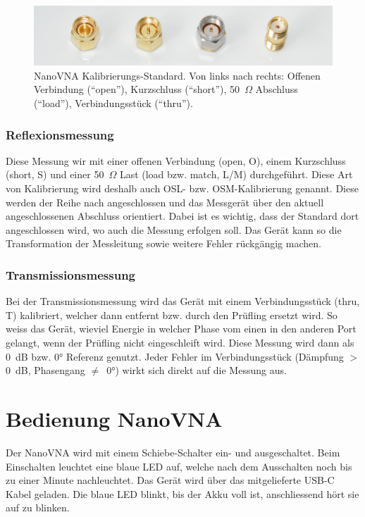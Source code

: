 \documentclass[twoside,a4paper,11pt,halfparskip,DIV=11,notitlepage]{scrartcl}
\newcommand{\Ohm}{$\Omega$\xspace}
\begin{document}
\begin{figure}[t]
    \includegraphics[width=\textwidth]{figures/calkit.jpg}
    \caption{NanoVNA Kalibrierungs-Standard. Von links nach rechts:
        Offenen Verbindung (``open''), Kurzschluss (``short''),
    50~\Ohm Abschluss (``load''), Verbindungsstück (``thru'').}
    \label{fig:calkit}
\end{figure}

\subsubsection{Reflexionsmessung}
Diese Messung wir mit einer offenen Verbindung (open, O), einem Kurzschluss
(short, S) und einer 50~\Ohm Last (load bzw. match, L/M) durchgeführt. Diese Art von
Kalibrierung wird deshalb auch OSL- bzw. OSM-Kalibrierung genannt. Diese
werden der Reihe nach angeschlossen und das Messgerät über den aktuell angeschlossenen
Abschluss orientiert. Dabei ist es wichtig, dass der Standard dort angeschlossen
wird, wo auch die Messung erfolgen soll. Das Gerät kann so die Transformation
der Messleitung sowie weitere Fehler rückgängig machen.

\subsubsection{Transmissionsmessung}
Bei der Transmissionsmessung wird das Gerät mit einem Verbindungsstück (thru, T) kalibriert,
welcher dann entfernt bzw. durch den Prüfling ersetzt wird. So weiss das  Gerät,
wieviel Energie in welcher Phase vom einen in den anderen Port gelangt, wenn der
Prüfling nicht eingeschleift wird. Diese Messung wird dann als 0~dB bzw. 0° Referenz
genutzt. Jeder Fehler im Verbindungsstück (Dämpfung $>$ 0~dB, Phasengang $\ne$~0°)
wirkt sich direkt auf die Messung aus.


\newpage %
\section{Bedienung NanoVNA}
Der NanoVNA wird mit einem Schiebe-Schalter ein- und ausgeschaltet. Beim Einschalten
leuchtet eine blaue LED auf, welche nach dem Ausschalten noch bis zu einer Minute
nachleuchtet. Das Gerät wird über das mitgelieferte USB-C Kabel geladen. Die blaue
LED blinkt, bis der Akku voll ist, anschliessend hört sie auf zu blinken.
\end{document}
